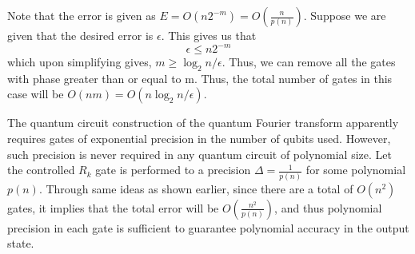 \begin{remark}
    Note that the error is given as $E=O(n2^{-m})=O\left(\frac{n}{p(n)}\right)$. Suppose we are given that the desired error is $\epsilon$. This gives us that 
    \[
    \epsilon\leq n2^{-m}
    \]
    which upon simplifying gives, $m\geq \log_2n/\epsilon$. Thus, we can remove all the gates with phase greater than or equal to m. Thus, the total number of gates in this case will be $O(nm)=O(n\log_2n/\epsilon)$.
\end{remark}
\begin{remark}
    The quantum circuit construction of the quantum Fourier transform apparently requires gates of exponential precision in the number of qubits used. However, such precision is never required in any quantum circuit of polynomial size. Let the controlled $R_k$ gate is performed to a precision $\Delta=\frac{1}{p(n)}$ for some polynomial $p(n)$. Through same ideas as shown earlier, since there are a total of $O(n^2)$ gates, it implies that the total error will be $O\left(\frac{n^2}{p(n)}\right)$, and thus polynomial precision in each gate is sufficient to guarantee polynomial accuracy in the output state.
\end{remark}


